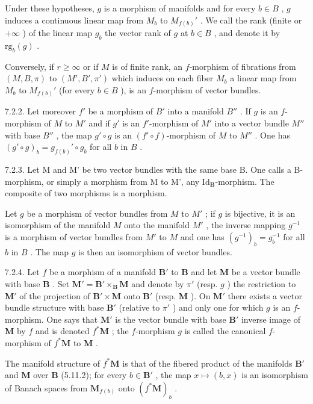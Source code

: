 Under these hypotheses, \(g\) is a morphism of manifolds and for every \(b \in B\) , \(g\) induces a continuous linear map from \(M_b\) to \(M_{f(b)}'\) . We call the rank (finite or \(+\infty\) ) of the linear map \(g_b\) the vector rank of \(g\) at \(b \in B\) , and denote it by \(\text{rg}_b(g)\) .

Conversely, if \(r \geqslant \infty\) or if \(M\) is of finite rank, an \(f\)-morphism of fibrations from \((M, B, \pi)\) to \((M', B', \pi')\) which induces on each fiber \(M_b\) a linear map from \(M_b\) to \(M_{f(b)}'\) (for every \(b \in B\) ), is an \(f\)-morphism of vector bundles.

7.2.2. Let moreover \(f'\) be a morphism of \(B'\) into a manifold \(B''\) . If \(g\) is an \(f\)-morphism of \(M\) to \(M'\) and if \(g'\) is an \(f'\)-morphism of \(M'\) into a vector bundle \(M''\) with base \(B''\) , the map \(g' \circ g\) is an \((f' \circ f)\)-morphism of \(M\) to \(M''\) . One has \((g' \circ g)_b = g_{f(b)}' \circ g_b\) for all \(b\) in \(B\) .

7.2.3. Let M and M' be two vector bundles with the same base B. One calls a B-morphism, or simply a morphism from M to M', any \(\mathrm{Id}_{\mathbf{B}}\)-morphism. The composite of two morphisms is a morphism.

Let \(g\) be a morphism of vector bundles from \(M\) to \(M'\) ; if \(g\) is bijective, it is an isomorphism of the manifold \(M\) onto the manifold \(M'\) , the inverse mapping \(g^{-1}\) is a morphism of vector bundles from \(M'\) to \(M\) and one has \((g^{-1})_b = g_b^{-1}\) for all \(b\) in \(B\) . The map \(g\) is then an isomorphism of vector bundles.

7.2.4. Let \(f\) be a morphism of a manifold \(\mathbf{B}'\) to \(\mathbf{B}\) and let \(\mathbf{M}\) be a vector bundle with base \(\mathbf{B}\) . Set \(\mathbf{M}' = \mathbf{B}' \times_{\mathbf{B}} \mathbf{M}\) and denote by \(\pi'\) (resp. \(g\) ) the restriction to \(\mathbf{M}'\) of the projection of \(\mathbf{B}' \times \mathbf{M}\) onto \(\mathbf{B}'\) (resp. \(\mathbf{M}\) ). On \(\mathbf{M}'\) there exists a vector bundle structure with base \(\mathbf{B}'\) (relative to \(\pi'\) ) and only one for which \(g\) is an \(f\)-morphism. One says that \(\mathbf{M}'\) is the vector bundle with base \(\mathbf{B}'\) inverse image of \(\mathbf{M}\) by \(f\) and is denoted \(f^* \mathbf{M}\) ; the \(f\)-morphism \(g\) is called the canonical \(f\)-morphism of \(f^* \mathbf{M}\) to \(\mathbf{M}\) .

The manifold structure of \(f^{*}\mathbf{M}\) is that of the fibered product of the manifolds \(\mathbf{B}'\) and \(\mathbf{M}\) over \(\mathbf{B}\) (5.11.2); for every \(b\in\mathbf{B}'\) , the map \(x\mapsto(b,x)\) is an isomorphism of Banach spaces from \(\mathbf{M}_{f(b)}\) onto \((f^{*}\mathbf{M})_{b}\) .

